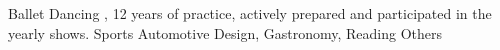 \vspace{0.5cm}


\vspace{0.5cm}

\begin{cvhonors}
  \cvhonor
    {Ballet Dancing}
    {, 12 years of practice, actively prepared and participated in the yearly shows.}
    {Sports}
  \cvhonor
    {Automotive Design, Gastronomy, Reading}
    {}
    {Others}
\end{cvhonors}
